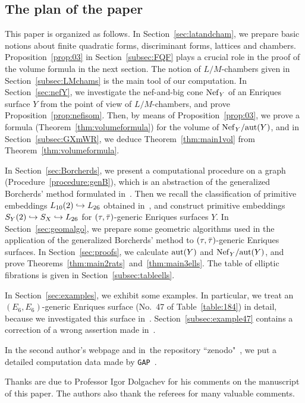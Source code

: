 \documentclass{amsart}
\numberwithin{procedure}{section}
\begin{document}
\subsection{The plan of the paper}\label{subsec:plan}
%
This paper is organized as follows.
%
In Section~\ref{sec:latandcham},
we prepare basic notions 
about finite quadratic forms, 
discriminant forms, lattices and chambers.
Proposition~\ref{prop:03}  in Section~\ref{subsec:FQF} plays 
a crucial role in the proof of the volume formula in the next section.
The notion of $L/M$-chambers given in Section~\ref{subsec:LMchams} is the main tool
of our computation.
In Section~\ref{sec:nefY}, we investigate 
the nef-and-big cone $\mathord{\rm Nef}_{Y}$ of an Enriques surface $Y$
from the point of view of $L/M$-chambers,
and prove Proposition~\ref{prop:nefisom}.
Then,
by means of Proposition~\ref{prop:03},
we prove a formula (Theorem~\ref{thm:volumeformula})
for the volume of $\mathord{\rm Nef}_{Y}/\mathord{\rm{aut}}(Y)$, and in Section~\ref{subsec:GXmWR},
 we deduce Theorem~\ref{thm:main1vol} from Theorem~\ref{thm:volumeformula}.
 \par
 In Section~\ref{sec:Borcherds},
 we present a computational procedure on a graph (Procedure~\ref{procedure:genB}),
 which is an abstraction of 
 the generalized Borcherds' method formulated in~\cite{Shimada2015}.
 Then we recall the classification of primitive embeddings $L_{10}(2)\hookrightarrow L_{26}$
obtained in~\cite{BS2019},
and construct primitive embeddings  $S_{Y}(2)\hookrightarrow S_{X}\hookrightarrow L_{26}$
for $(\tau, \bar{\tau})$-generic Enriques surfaces $Y$.
%
In Section~\ref{sec:geomalgo},
we prepare some geometric algorithms used in the application of 
the generalized Borcherds' method to $(\tau, \bar{\tau})$-generic Enriques surfaces.
%
In Section~\ref{sec:proofs}, 
we calculate $\mathord{\rm{aut}}(Y)$ and $\mathord{\rm Nef}_{Y}/\mathord{\rm{aut}}(Y)$, and  prove 
Theorems~\ref{thm:main2rats}~and~\ref{thm:main3ells}.
The table of elliptic fibrations is given in Section~\ref{subsec:tableells}.

In Section~\ref{sec:examples},  we exhibit some examples.
In particular,  we treat 
an $(E_6, E_6)$-generic Enriques surface
(No.~47 of Table~\ref{table:184}) in detail,
because we  investigated this surface 
in~\cite{Shimada2019}.
Section~\ref{subsec:example47} contains 
a correction of a wrong assertion
made in~\cite{Shimada2019}.
\par 
In the second author's webpage and in~the repository ``zenodo"~\cite{AutEnrVolCompdata},
we put a detailed computation data made by {\tt GAP}~\cite{GAP}.
%
\par 
\medskip
%
Thanks are due to Professor Igor Dolgachev 
for his comments on the manuscript of this paper.
The authors also thank the referees for many valuable comments.
%
%
%
%
\end{document}
